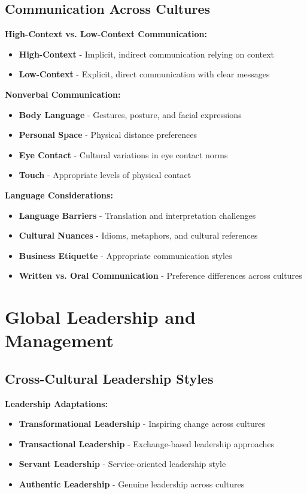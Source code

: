 \documentclass[12pt]{article}
\begin{document}
\subsection{Communication Across Cultures}

\textbf{High-Context vs. Low-Context Communication:}
\begin{itemize}
    \item \textbf{High-Context} - Implicit, indirect communication relying on context
    \item \textbf{Low-Context} - Explicit, direct communication with clear messages
\end{itemize}

\textbf{Nonverbal Communication:}
\begin{itemize}
    \item \textbf{Body Language} - Gestures, posture, and facial expressions
    \item \textbf{Personal Space} - Physical distance preferences
    \item \textbf{Eye Contact} - Cultural variations in eye contact norms
    \item \textbf{Touch} - Appropriate levels of physical contact
\end{itemize}

\textbf{Language Considerations:}
\begin{itemize}
    \item \textbf{Language Barriers} - Translation and interpretation challenges
    \item \textbf{Cultural Nuances} - Idioms, metaphors, and cultural references
    \item \textbf{Business Etiquette} - Appropriate communication styles
    \item \textbf{Written vs. Oral Communication} - Preference differences across cultures
\end{itemize}

\section{Global Leadership and Management}

\subsection{Cross-Cultural Leadership Styles}

\textbf{Leadership Adaptations:}
\begin{itemize}
    \item \textbf{Transformational Leadership} - Inspiring change across cultures
    \item \textbf{Transactional Leadership} - Exchange-based leadership approaches
    \item \textbf{Servant Leadership} - Service-oriented leadership style
    \item \textbf{Authentic Leadership} - Genuine leadership across cultures
\end{itemize}
\end{document}
